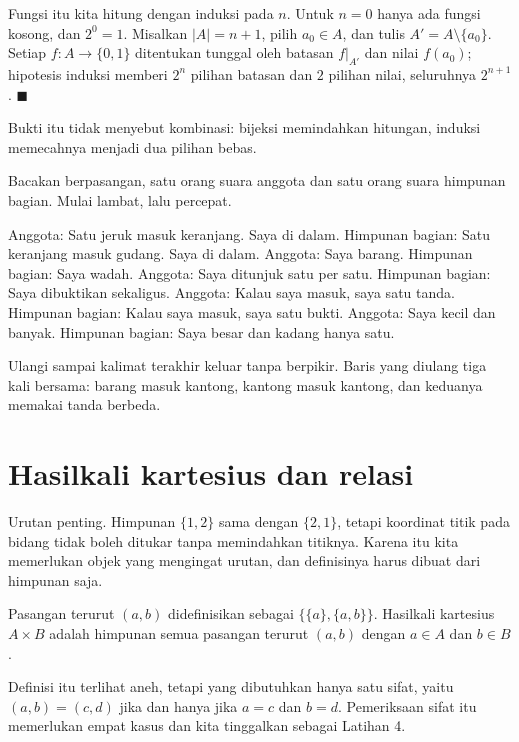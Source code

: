 Fungsi itu kita hitung dengan induksi pada $n$. Untuk $n = 0$ hanya ada fungsi
kosong, dan $2^{0} = 1$. Misalkan $|A| = n+1$, pilih $a_0 \in A$, dan tulis
$A' = A \setminus \{a_0\}$. Setiap $f : A \to \{0,1\}$ ditentukan tunggal oleh batasan
$f|_{A'}$ dan nilai $f(a_0)$; hipotesis induksi memberi $2^{n}$ pilihan batasan dan $2$
pilihan nilai, seluruhnya $2^{n+1}$.
\hfill$\blacksquare${\parfillskip=0pt\par}

Bukti itu tidak menyebut kombinasi: bijeksi memindahkan hitungan, induksi memecahnya
menjadi dua pilihan bebas.

\begin{bacakeras}
Bacakan berpasangan, satu orang suara anggota dan satu orang suara himpunan bagian.
Mulai lambat, lalu percepat.

Anggota: Satu jeruk masuk keranjang. Saya di dalam.
Himpunan bagian: Satu keranjang masuk gudang. Saya di dalam.
Anggota: Saya barang.
Himpunan bagian: Saya wadah.
Anggota: Saya ditunjuk satu per satu.
Himpunan bagian: Saya dibuktikan sekaligus.
Anggota: Kalau saya masuk, saya satu tanda.
Himpunan bagian: Kalau saya masuk, saya satu bukti.
Anggota: Saya kecil dan banyak.
Himpunan bagian: Saya besar dan kadang hanya satu.

Ulangi sampai kalimat terakhir keluar tanpa berpikir. Baris yang diulang tiga kali
bersama: barang masuk kantong, kantong masuk kantong, dan keduanya memakai tanda
berbeda.
\end{bacakeras}

\section{Hasilkali kartesius dan relasi}

Urutan penting. Himpunan $\{1,2\}$ sama dengan $\{2,1\}$, tetapi koordinat titik pada
bidang tidak boleh ditukar tanpa memindahkan titiknya. Karena itu kita memerlukan
objek yang mengingat urutan, dan definisinya harus dibuat dari himpunan saja.

\begin{definisi}
Pasangan terurut $(a,b)$ didefinisikan sebagai $\{\{a\}, \{a,b\}\}$. Hasilkali
kartesius $A \times B$ adalah himpunan semua pasangan terurut $(a,b)$ dengan $a \in A$
dan $b \in B$.
\end{definisi}

Definisi itu terlihat aneh, tetapi yang dibutuhkan hanya satu sifat, yaitu
$(a,b) = (c,d)$ jika dan hanya jika $a = c$ dan $b = d$. Pemeriksaan sifat itu
memerlukan empat kasus dan kita tinggalkan sebagai Latihan 4.

